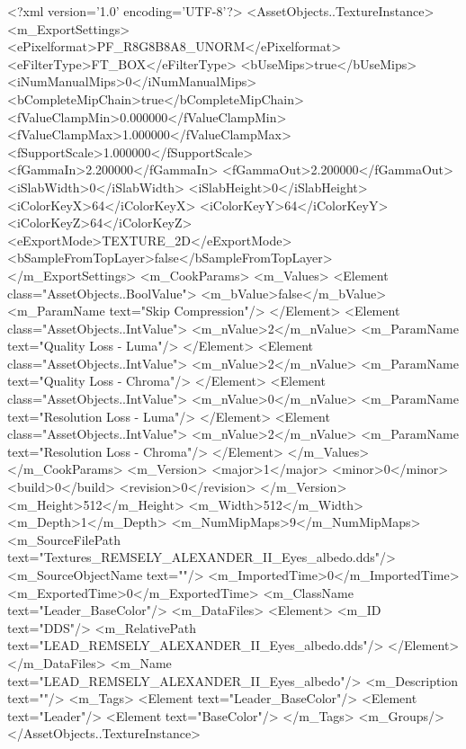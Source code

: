 <?xml version='1.0' encoding='UTF-8'?>
<AssetObjects..TextureInstance>
  <m_ExportSettings>
    <ePixelformat>PF_R8G8B8A8_UNORM</ePixelformat>
    <eFilterType>FT_BOX</eFilterType>
    <bUseMips>true</bUseMips>
    <iNumManualMips>0</iNumManualMips>
    <bCompleteMipChain>true</bCompleteMipChain>
    <fValueClampMin>0.000000</fValueClampMin>
    <fValueClampMax>1.000000</fValueClampMax>
    <fSupportScale>1.000000</fSupportScale>
    <fGammaIn>2.200000</fGammaIn>
    <fGammaOut>2.200000</fGammaOut>
    <iSlabWidth>0</iSlabWidth>
    <iSlabHeight>0</iSlabHeight>
    <iColorKeyX>64</iColorKeyX>
    <iColorKeyY>64</iColorKeyY>
    <iColorKeyZ>64</iColorKeyZ>
    <eExportMode>TEXTURE_2D</eExportMode>
    <bSampleFromTopLayer>false</bSampleFromTopLayer>
  </m_ExportSettings>
  <m_CookParams>
    <m_Values>
      <Element class="AssetObjects..BoolValue">
        <m_bValue>false</m_bValue>
        <m_ParamName text="Skip Compression"/>
      </Element>
      <Element class="AssetObjects..IntValue">
        <m_nValue>2</m_nValue>
        <m_ParamName text="Quality Loss - Luma"/>
      </Element>
      <Element class="AssetObjects..IntValue">
        <m_nValue>2</m_nValue>
        <m_ParamName text="Quality Loss - Chroma"/>
      </Element>
      <Element class="AssetObjects..IntValue">
        <m_nValue>0</m_nValue>
        <m_ParamName text="Resolution Loss - Luma"/>
      </Element>
      <Element class="AssetObjects..IntValue">
        <m_nValue>2</m_nValue>
        <m_ParamName text="Resolution Loss - Chroma"/>
      </Element>
    </m_Values>
  </m_CookParams>
  <m_Version>
    <major>1</major>
    <minor>0</minor>
    <build>0</build>
    <revision>0</revision>
  </m_Version>
  <m_Height>512</m_Height>
  <m_Width>512</m_Width>
  <m_Depth>1</m_Depth>
  <m_NumMipMaps>9</m_NumMipMaps>
  <m_SourceFilePath text="Textures\LEAD_REMSELY_ALEXANDER_II_Eyes_albedo.dds"/>
  <m_SourceObjectName text=""/>
  <m_ImportedTime>0</m_ImportedTime>
  <m_ExportedTime>0</m_ExportedTime>
  <m_ClassName text="Leader_BaseColor"/>
  <m_DataFiles>
    <Element>
      <m_ID text="DDS"/>
      <m_RelativePath text="LEAD_REMSELY_ALEXANDER_II_Eyes_albedo.dds"/>
    </Element>
  </m_DataFiles>
  <m_Name text="LEAD_REMSELY_ALEXANDER_II_Eyes_albedo"/>
  <m_Description text=""/>
  <m_Tags>
    <Element text="Leader_BaseColor"/>
    <Element text="Leader"/>
    <Element text="BaseColor"/>
  </m_Tags>
  <m_Groups/>
</AssetObjects..TextureInstance>
